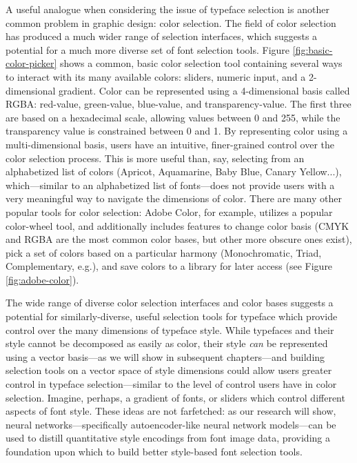 A useful analogue when considering the issue of typeface selection is another common problem in graphic design: color selection. The field of color selection has produced a much wider range of selection interfaces, which suggests a potential for a much more diverse set of font selection tools. Figure \ref{fig:basic-color-picker} shows a common, basic color selection tool containing several ways to interact with its many available colors: sliders, numeric input, and a 2-dimensional gradient. Color can be represented using a 4-dimensional basis called RGBA: red-value, green-value, blue-value, and transparency-value. The first three are based on a hexadecimal scale, allowing values between 0 and 255, while the transparency value is constrained between 0 and 1. By representing color using a multi-dimensional basis, users have an intuitive, finer-grained control over the color selection process. This is more useful than, say, selecting from an alphabetized list of colors (Apricot, Aquamarine, Baby Blue, Canary Yellow...), which---similar to an alphabetized list of fonts---does not provide users with a very meaningful way to navigate the dimensions of color. There are many other popular tools for color selection: Adobe Color, for example, utilizes a popular color-wheel tool, and additionally includes features to change color basis (CMYK and RGBA are the most common color bases, but other more obscure ones exist), pick a set of colors based on a particular harmony (Monochromatic, Triad, Complementary, e.g.), and save colors to a library for later access (see Figure \ref{fig:adobe-color}).

The wide range of diverse color selection interfaces and color bases suggests a potential for similarly-diverse, useful selection tools for typeface which provide control over the many dimensions of typeface style. While typefaces and their style cannot be decomposed as easily as color, their style \emph{can} be represented using a vector basis---as we will show in subsequent chapters---and building selection tools on a vector space of style dimensions could allow users greater control in typeface selection---similar to the level of control users have in color selection. Imagine, perhaps, a gradient of fonts, or sliders which control different aspects of font style. These ideas are not farfetched: as our research will show, neural networks---specifically autoencoder-like neural network models---can be used to distill quantitative style encodings from font image data, providing a foundation upon which to build better style-based font selection tools.


